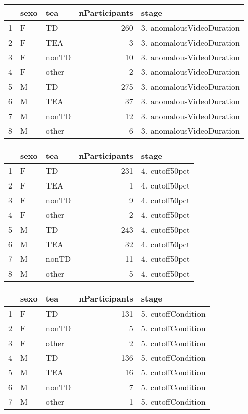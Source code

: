 \documentclass{article}
\begin{document}
\begin{table}[ht]
\centering
\begin{tabular}{rllrl}
  \hline
 & sexo & tea & nParticipants & stage \\ 
  \hline
  1 & F & TD & 260 & 3. anomalousVideoDuration \\ 
  2 & F & TEA &   3 & 3. anomalousVideoDuration \\ 
  3 & F & nonTD &  10 & 3. anomalousVideoDuration \\ 
  4 & F & other &   2 & 3. anomalousVideoDuration \\ 
  5 & M & TD & 275 & 3. anomalousVideoDuration \\ 
  6 & M & TEA &  37 & 3. anomalousVideoDuration \\ 
  7 & M & nonTD &  12 & 3. anomalousVideoDuration \\ 
  8 & M & other &   6 & 3. anomalousVideoDuration \\ 
   \hline
\end{tabular}
\end{table}

\begin{table}[ht]
\centering
\begin{tabular}{rllrl}
  \hline
 & sexo & tea & nParticipants & stage \\ 
  \hline
  1 & F & TD & 231 & 4. cutoff50pct \\ 
  2 & F & TEA &   1 & 4. cutoff50pct \\ 
  3 & F & nonTD &   9 & 4. cutoff50pct \\ 
  4 & F & other &   2 & 4. cutoff50pct \\ 
  5 & M & TD & 243 & 4. cutoff50pct \\ 
  6 & M & TEA &  32 & 4. cutoff50pct \\ 
  7 & M & nonTD &  11 & 4. cutoff50pct \\ 
  8 & M & other &   5 & 4. cutoff50pct \\ 
   \hline
\end{tabular}
\end{table}

\begin{table}[ht]
\centering
\begin{tabular}{rllrl}
  \hline
 & sexo & tea & nParticipants & stage \\ 
  \hline
  1 & F & TD & 131 & 5. cutoffCondition \\ 
  2 & F & nonTD &   5 & 5. cutoffCondition \\ 
  3 & F & other &   2 & 5. cutoffCondition \\ 
  4 & M & TD & 136 & 5. cutoffCondition \\ 
  5 & M & TEA &  16 & 5. cutoffCondition \\ 
  6 & M & nonTD &   7 & 5. cutoffCondition \\ 
  7 & M & other &   1 & 5. cutoffCondition \\ 
   \hline
\end{tabular}
\end{table}
\end{document}

